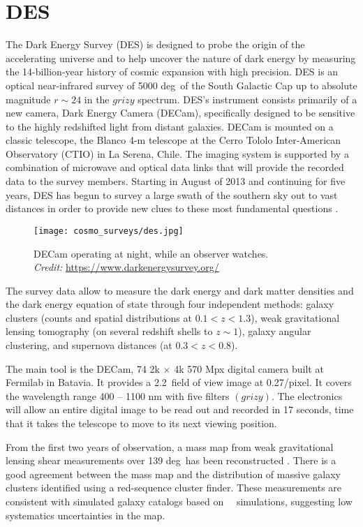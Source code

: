 \section{DES}
\label{DES}
The Dark Energy Survey (DES) is designed to probe the origin of the accelerating universe and to help uncover the nature of dark energy by measuring the \mbox{14-billion-year} history of cosmic expansion with high precision. DES is an optical near-infrared survey of 5000 deg\sq\ of the South Galactic Cap up to absolute magnitude $r\sim24$ in the $grizy$ spectrum. DES's instrument consists primarily of a new camera, Dark Energy Camera (DECam), specifically designed to be sensitive to the highly redshifted light from distant galaxies. DECam is mounted on a classic telescope, the Blanco 4-m telescope at the Cerro Tololo Inter-American Observatory (CTIO) in La Serena, Chile. The imaging system is supported by a combination of microwave and optical data links that will provide the recorded data to the survey members. Starting in August of 2013 and continuing for five years, DES has begun to survey a large swath of the southern sky out to vast distances in order to provide new clues to these most fundamental questions \cite{DES}.

\begin{figure}[htb]
    \centering
    \texttt{[image: cosmo\_surveys/des.jpg]}
    \caption{DECam operating at night, while an observer watches.\\\textit{Credit:} \url{https://www.darkenergysurvey.org/}}
    \label{fig:des}
\end{figure}
The survey data allow to measure the dark energy and dark matter densities and the dark energy equation of state through four independent methods: galaxy clusters (counts and spatial distributions at $0.1<z<1.3$), weak gravitational lensing tomography (on several redshift shells to $z\sim1$), galaxy angular clustering, and supernova distances (at $0.3<z<0.8$).

The main tool is the DECam, 74 2k $\times$ 4k 570 Mpx digital camera built at Fermilab in Batavia. It provides a 2.2\textdegree\ field of view image at 0.27\arcsec/pixel. It covers the wavelength range 400 -- 1100 nm with five filters $(grizy)$. The electronics will allow an entire digital image to be read out and recorded in 17 seconds, time that it takes the telescope to move to its next viewing position.

From the first two years of observation, a mass map from weak gravitational lensing shear measurements over 139 deg\sq\ has been reconstructed \cite{DES_mass}. There is a good agreement between the mass map and the distribution of massive galaxy clusters identified using a red-sequence cluster finder. These measurements are consistent with simulated galaxy catalogs based on \LCDM\ \nbody\ simulations, suggesting low systematics uncertainties in the map.

